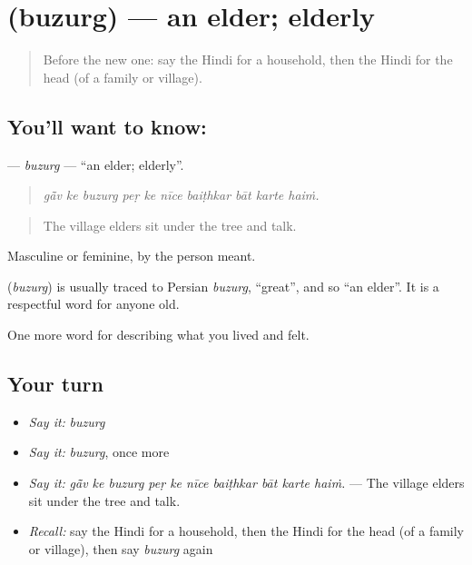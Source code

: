 \section[\texorpdfstring{\hi{बुज़ुर्ग} (buzurg)}{बुज़ुर्ग (buzurg)}]{ (buzurg) — an elder; elderly}

\label{lesson:HI-C503-buzurg}



\begin{quote}
Before the new one: say the Hindi for a household, then the Hindi for the head (of a family or village).
\end{quote}

\subsection*{You'll want to know: }
\textbf{} — \emph{buzurg} — \textquotedblleft{}an elder; elderly\textquotedblright{}.

\begin{quote}
         
\end{quote}

\begin{quote}
\emph{gā̃v ke buzurg peṛ ke nīce baiṭhkar bāt karte haiṁ.}
\end{quote}

\begin{quote}
The village elders sit under the tree and talk.
\end{quote}

Masculine or feminine, by the person meant.

\begin{cousinweb}
\textbf{} (\emph{buzurg}) is usually traced to Persian \emph{buzurg}, \textquotedblleft{}great\textquotedblright{}, and so \textquotedblleft{}an elder\textquotedblright{}. It is a respectful word for anyone old.
\end{cousinweb}

\begin{grammarlens}[title={What you've built}]
One more word for describing what you lived and felt.
\end{grammarlens}

\subsection*{Your turn}
\begin{itemize}
\raggedright
  \item \emph{Say it:} \emph{buzurg}
  \item \emph{Say it:} \emph{buzurg}, once more
  \item \emph{Say it:} \emph{gā̃v ke buzurg peṛ ke nīce baiṭhkar bāt karte haiṁ.} — The village elders sit under the tree and talk.
  \item \emph{Recall:} say the Hindi for a household, then the Hindi for the head (of a family or village), then say \emph{buzurg} again
\end{itemize}

